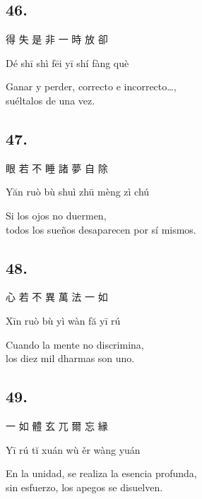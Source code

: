 \documentclass[
  a5paperpaper,
]{article}
\begin{document}
\begin{verseblock}

\hypertarget{section-120}{%
\subsection{46.}\label{section-120}}

得 失 是 非 一 時 放 卻

Dé shī shì fēi yī shí fàng què

Ganar y perder, correcto e incorrecto\ldots,\\
suéltalos de una vez.

\end{verseblock}

\begin{verseblock}

\hypertarget{section-121}{%
\subsection{47.}\label{section-121}}

眼 若 不 睡 諸 夢 自 除

Yăn ruò bù shuì zhū mèng zì chú

Si los ojos no duermen,\\
todos los sueños desaparecen por sí mismos.

\end{verseblock}

\begin{verseblock}

\hypertarget{section-122}{%
\subsection{48.}\label{section-122}}

心 若 不 異 萬 法 一 如

Xīn ruò bù yì wàn fă yī rú

Cuando la mente no discrimina,\\
los diez mil dharmas son uno.

\end{verseblock}

\begin{verseblock}

\hypertarget{section-123}{%
\subsection{49.}\label{section-123}}

一 如 體 玄 兀 爾 忘 縁

Yī rú tĭ xuán wù ěr wàng yuán

En la unidad, se realiza la esencia profunda,\\
sin esfuerzo, los apegos se disuelven.

\end{verseblock}
\end{document}
